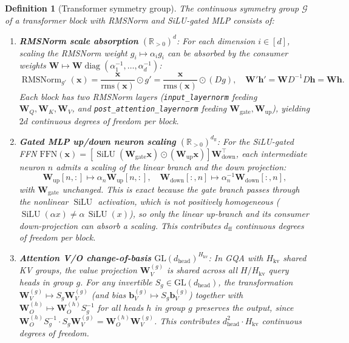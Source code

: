 \documentclass{article}
\newtheorem{definition}[theorem]{Definition}
\newcommand{\R}{\mathbb{R}}
\newcommand{\cG}{\mathcal{G}}
\newcommand{\bh}{\mathbf{h}}
\newcommand{\bx}{\mathbf{x}}
\newcommand{\bW}{\mathbf{W}}
\DeclareMathOperator{\diag}{diag}
\DeclareMathOperator{\SiLU}{SiLU}
\DeclareMathOperator{\RMSNorm}{RMSNorm}
\begin{document}
\begin{definition}[Transformer symmetry group]
\label{def:symmetry}
The continuous symmetry group $\cG$ of a transformer block with RMSNorm and SiLU-gated MLP consists of:
\begin{enumerate}
 \item \textbf{RMSNorm scale absorption} $(\R_{>0})^d$: For each dimension $i \in [d]$, scaling the RMSNorm weight $g_i \mapsto \alpha_i g_i$ can be absorbed by the consumer weights $\bW \mapsto \bW \diag(\alpha_1^{-1}, \ldots, \alpha_d^{-1})$:
 \begin{equation}\label{eq:rmsnorm-sym}
 \RMSNorm_{g'}(\bx) = \frac{\bx}{\text{rms}(\bx)} \odot g' = \frac{\bx}{\text{rms}(\bx)} \odot (D g),
 \quad \bW' \bh' = \bW D^{-1} D \bh = \bW \bh.
 \end{equation}
 Each block has two RMSNorm layers (\texttt{input\_layernorm} feeding $\bW_Q, \bW_K, \bW_V$, and \texttt{post\_attention\_layernorm} feeding $\bW_{\text{gate}}, \bW_{\text{up}}$), yielding $2d$ continuous degrees of freedom per block.

 \item \textbf{Gated MLP up/down neuron scaling} $(\R_{>0})^{d_\text{ff}}$: For the SiLU-gated FFN $\text{FFN}(\bx) = [\SiLU(\bW_{\text{gate}} \bx) \odot (\bW_{\text{up}} \bx)] \bW_{\text{down}}^\top$, each intermediate neuron $n$ admits a scaling of the \emph{linear} branch and the down projection:
 \begin{equation}\label{eq:ffn-sym}
 \bW_{\text{up}}[n,:] \mapsto \alpha_n \bW_{\text{up}}[n,:], \quad
 \bW_{\text{down}}[:,n] \mapsto \alpha_n^{-1} \bW_{\text{down}}[:,n],
 \end{equation}
 with $\bW_{\text{gate}}$ unchanged. This is exact because the gate branch passes through the nonlinear $\SiLU$ activation, which is \emph{not} positively homogeneous ($\SiLU(\alpha x) \neq \alpha\,\SiLU(x)$), so only the linear up-branch and its consumer down-projection can absorb a scaling.
 This contributes $d_\text{ff}$ continuous degrees of freedom per block.

 \item \textbf{Attention V/O change-of-basis} $\mathrm{GL}(d_\text{head})^{H_{\text{kv}}}$: In GQA with $H_{\text{kv}}$ shared KV groups, the value projection $\bW_V^{(g)}$ is shared across all $H/H_{\text{kv}}$ query heads in group $g$. For any invertible $S_g \in \mathrm{GL}(d_\text{head})$, the transformation $\bW_V^{(g)} \mapsto S_g \bW_V^{(g)}$ (and bias $\mathbf{b}_V^{(g)} \mapsto S_g \mathbf{b}_V^{(g)}$) together with $\bW_O^{(h)} \mapsto \bW_O^{(h)} S_g^{-1}$ for all heads $h$ in group $g$ preserves the output, since $\bW_O^{(h)} S_g^{-1} \cdot S_g \bW_V^{(g)} = \bW_O^{(h)} \bW_V^{(g)}$. This contributes $d_\text{head}^2 \cdot H_{\text{kv}}$ continuous degrees of freedom.


\end{enumerate}
\end{definition}
\end{document}
